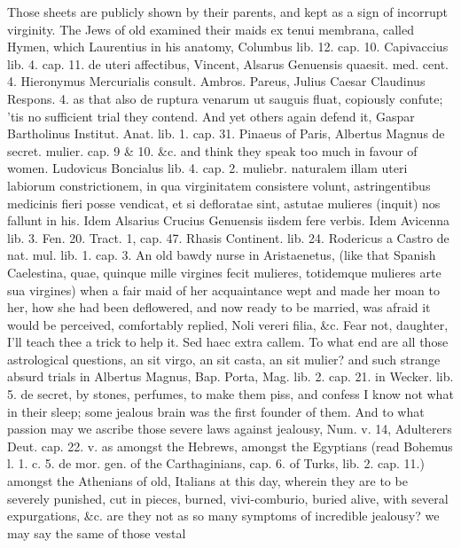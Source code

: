 {Those sheets are publicly shown by their parents, and kept as a sign of
incorrupt virginity. The Jews of old examined their maids ex tenui
membrana, called Hymen, which Laurentius in his anatomy, Columbus lib.
12. cap. 10. Capivaccius lib. 4. cap. 11. de uteri affectibus, Vincent,
Alsarus Genuensis quaesit. med. cent. 4. Hieronymus Mercurialis
consult. Ambros. Pareus, Julius Caesar Claudinus Respons. 4. as that
also de ruptura venarum ut sauguis fluat, copiously confute; 'tis
no sufficient trial they contend. And yet others again defend it,
Gaspar Bartholinus Institut. Anat. lib. 1. cap. 31. Pinaeus of Paris,
Albertus Magnus de secret. mulier. cap. 9 \& 10. \&c. and think they
speak too much in favour of women.  Ludovicus Boncialus lib. 4.
cap. 2. muliebr. naturalem illam uteri labiorum constrictionem, in qua
virginitatem consistere volunt, astringentibus medicinis fieri posse
vendicat, et si defloratae sint, astutae mulieres (inquit) nos
fallunt in his. Idem Alsarius Crucius Genuensis iisdem fere verbis.
Idem Avicenna lib. 3. Fen. 20. Tract. 1, cap. 47. Rhasis
Continent. lib. 24. Rodericus a Castro de nat. mul. lib. 1. cap. 3. An
old bawdy nurse in Aristaenetus, (like that Spanish Caelestina,
quae, quinque mille virgines fecit mulieres, totidemque mulieres
arte sua virgines) when a fair maid of her acquaintance wept and made
her moan to her, how she had been deflowered, and now ready to be
married, was afraid it would be perceived, comfortably replied, Noli
vereri filia, \&c. Fear not, daughter, I'll teach thee a trick to help
it. Sed haec extra callem. To what end are all those astrological
questions, an sit virgo, an sit casta, an sit mulier? and such strange
absurd trials in Albertus Magnus, Bap. Porta, Mag. lib. 2. cap. 21. in
Wecker. lib. 5. de secret, by stones, perfumes, to make them piss, and
confess I know not what in their sleep; some jealous brain was the
first founder of them. And to what passion may we ascribe those severe
laws against jealousy, Num. v. 14, Adulterers Deut. cap. 22. v. 
as amongst the Hebrews, amongst the Egyptians (read Bohemus l. 1.
c. 5. de mor. gen. of the Carthaginians, cap. 6. of Turks, lib. 2. cap.
11.) amongst the Athenians of old, Italians at this day, wherein they
are to be severely punished, cut in pieces, burned, vivi-comburio,
buried alive, with several expurgations, \&c. are they not as so many
symptoms of incredible jealousy? we may say the same of those vestal
}
